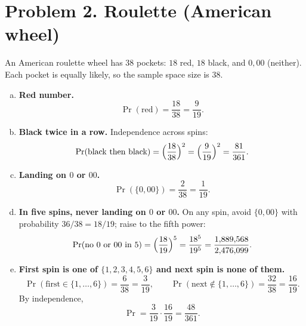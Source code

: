 
\section*{Problem 2. Roulette (American wheel)}

An American roulette wheel has $38$ pockets: $18$ red, $18$ black, and $0,00$ (neither).
Each pocket is equally likely, so the sample space size is $38$.

\begin{enumerate}[(a)]
\item \textbf{Red number.}
\[
\Pr(\text{red})=\frac{18}{38}=\frac{9}{19}.
\]

\item \textbf{Black twice in a row.}
Independence across spins:
\[
\Pr(\text{black then black})=\Bigl(\frac{18}{38}\Bigr)^2=\Bigl(\frac{9}{19}\Bigr)^2=\frac{81}{361}.
\]

\item \textbf{Landing on $0$ or $00$.}
\[
\Pr(\{0,00\})=\frac{2}{38}=\frac{1}{19}.
\]

\item \textbf{In five spins, never landing on $0$ or $00$.}
On any spin, avoid $\{0,00\}$ with probability $36/38=18/19$; raise to the fifth power:
\[
\Pr(\text{no }0\text{ or }00\text{ in 5})=\Bigl(\frac{18}{19}\Bigr)^5=\frac{18^5}{19^5}=\frac{1{,}889{,}568}{2{,}476{,}099}.
\]

\item \textbf{First spin is one of $\{1,2,3,4,5,6\}$ and next spin is none of them.}
\[
\Pr(\text{first}\in\{1,\dots,6\})=\frac{6}{38}=\frac{3}{19},\qquad
\Pr(\text{next}\notin\{1,\dots,6\})=\frac{32}{38}=\frac{16}{19}.
\]
By independence,
\[
\Pr=\frac{3}{19}\cdot\frac{16}{19}=\frac{48}{361}.
\]
\end{enumerate}

